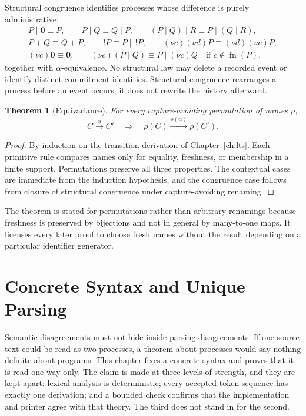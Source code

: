 \documentclass[11pt,openany]{book}
\newtheorem{theorem}{Theorem}[chapter]
\theoremstyle{remark}
\newcommand{\fn}{\operatorname{fn}}
\begin{document}
Structural congruence identifies processes whose difference is purely
administrative:
\[
\begin{gathered}
P\mid\mathbf 0\equiv P,
\qquad P\mid Q\equiv Q\mid P,
\qquad (P\mid Q)\mid R\equiv P\mid(Q\mid R),\\
P+Q\equiv Q+P,
\qquad !P\equiv P\mid\,!P,
\qquad (\nu c)(\nu d)P\equiv(\nu d)(\nu c)P,\\
(\nu c)\mathbf 0\equiv\mathbf 0,
\qquad
(\nu c)(P\mid Q)\equiv P\mid(\nu c)Q
\quad\text{if }c\notin\fn(P),
\end{gathered}
\]
together with $\alpha$-equivalence. No structural law may delete a
recorded event or identify distinct commitment identities. Structural
congruence rearranges a process before an event occurs; it does not
rewrite the history afterward.

\begin{theorem}[Equivariance]\label{thm:equiv}
For every capture-avoiding permutation of names $\rho$,
\[
C\xrightarrow{\alpha}C'
\quad\Longrightarrow\quad
\rho(C)\xrightarrow{\rho(\alpha)}\rho(C').
\]
\end{theorem}

\begin{proof}
By induction on the transition derivation of
Chapter~\ref{ch:lts}. Each primitive rule compares names only for
equality, freshness, or membership in a finite support. Permutations
preserve all three properties. The contextual cases are immediate from
the induction hypothesis, and the congruence case follows from closure of
structural congruence under capture-avoiding renaming.
\end{proof}

The theorem is stated for permutations rather than arbitrary renamings
because freshness is preserved by bijections and not in general by
many-to-one maps. It licenses every later proof to choose fresh names
without the result depending on a particular identifier generator.

\chapter{Concrete Syntax and Unique Parsing}
\label{ch:parsing}

Semantic disagreements must not hide inside parsing disagreements. If one
source text could be read as two processes, a theorem about processes
would say nothing definite about programs. This chapter fixes a concrete
syntax and proves that it is read one way only. The claim is made at
three levels of strength, and they are kept apart: lexical analysis is
deterministic; every accepted token sequence has exactly one derivation;
and a bounded check confirms that the implementation and printer agree
with that theory. The third does not stand in for the second.
\end{document}
